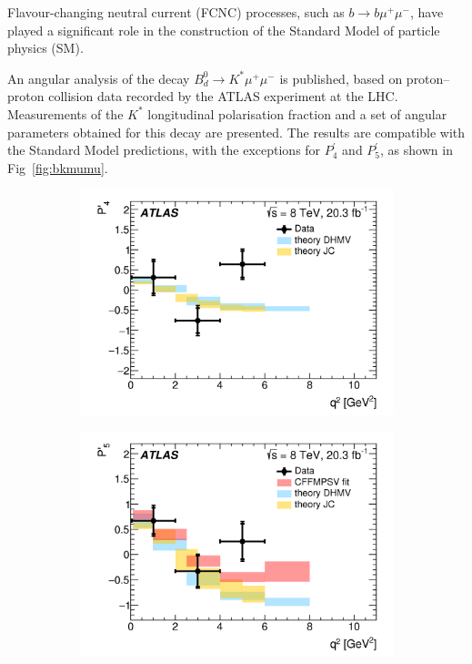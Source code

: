 \documentclass[epj]{webofc}
\begin{document}
Flavour-changing neutral current (FCNC) processes, such as $b \to b \mu^{+} \mu^{-}$, 
have played a significant role in the construction of the Standard Model of particle physics (SM).

An angular analysis of the decay $B^0_d \rightarrow K^{*}\mu^+\mu^-$ is published, 
based on proton–proton collision data recorded by the ATLAS experiment at the LHC. 
Measurements of the $K^{*}$ longitudinal polarisation fraction and a set of angular 
parameters obtained for this decay are presented. The results are compatible 
with the Standard Model predictions, with the exceptions for $P_4^{\prime}$ and
$P_5^{\prime}$, as shown in Fig~\ref{fig:bkmumu}.


\begin{figure}
    \centering
    \begin{subfigure}[H]{0.45\textwidth}
        \includegraphics[width=\textwidth]{plots/bkmumu/fig_11b.png}
    \end{subfigure}
    \begin{subfigure}[H]{0.45\textwidth}
        \includegraphics[width=\textwidth]{plots/bkmumu/fig_11c.png}

\end{subfigure}
\end{figure}
\end{document}
